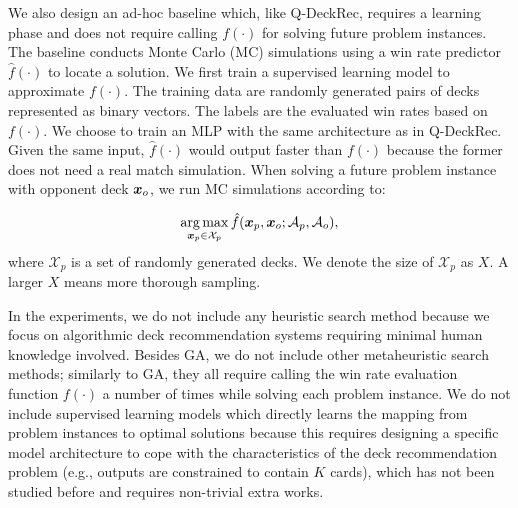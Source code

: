 We also design an ad-hoc baseline which, like Q-DeckRec, requires a learning phase and does not require calling $f(\cdot)$ for solving future problem instances. The baseline conducts Monte Carlo (MC) simulations using a win rate predictor $\hat{f}(\cdot)$ to locate a solution. We first train a supervised learning model to approximate $f(\cdot)$. The training data are randomly generated pairs of decks represented as binary vectors. The labels are the evaluated win rates based on $f(\cdot)$. We choose to train an MLP with the same architecture as in Q-DeckRec. Given the same input, $\hat{f}(\cdot)$ would output faster than $f(\cdot)$ because the former does not need a real match simulation. When solving a future problem instance with opponent deck $\boldsymbol{x}_o$, we run MC simulations according to:

\begin{align}
\operatorname*{arg\,max}_{\boldsymbol{x}_p \in \mathcal{X}_p} \hat{f}(\boldsymbol{x}_p, \boldsymbol{x}_o; \mathcal{A}_p, \mathcal{A}_o),
\label{eqn:mcmaxobj}
\end{align}
where $\mathcal{X}_p$ is a set of randomly generated decks. We denote the size of $\mathcal{X}_p$ as $X$. A larger $X$ means more thorough sampling.

In the experiments, we do not include any heuristic search method because we focus on algorithmic deck recommendation systems requiring minimal human knowledge involved. Besides GA, we do not include other metaheuristic search methods; similarly to GA, they all require calling the win rate evaluation function $f(\cdot)$ a number of times while solving each problem instance. We do not include  supervised learning models which directly learns the mapping from problem instances to optimal solutions because this requires designing a specific model architecture to cope with the characteristics of the deck recommendation problem (e.g., outputs are constrained to contain $K$ cards), which has not been studied before and requires non-trivial extra works.

